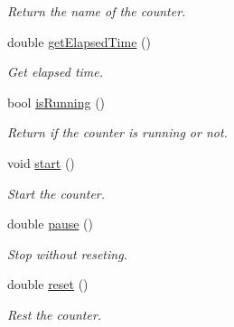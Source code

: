 \begin{DoxyCompactItemize}
\begin{DoxyCompactList}\small\item\em Return the name of the counter. \end{DoxyCompactList}\item 
\hypertarget{class_time_counter_a27d1998986d33b4d037b7ed21f121b97}{double \hyperlink{class_time_counter_a27d1998986d33b4d037b7ed21f121b97}{get\+Elapsed\+Time} ()}\label{class_time_counter_a27d1998986d33b4d037b7ed21f121b97}

\begin{DoxyCompactList}\small\item\em Get elapsed time. \end{DoxyCompactList}\item 
\hypertarget{class_time_counter_a08647c9c74e1b6ba366df28e1d27e67e}{bool \hyperlink{class_time_counter_a08647c9c74e1b6ba366df28e1d27e67e}{is\+Running} ()}\label{class_time_counter_a08647c9c74e1b6ba366df28e1d27e67e}

\begin{DoxyCompactList}\small\item\em Return if the counter is running or not. \end{DoxyCompactList}\item 
\hypertarget{class_time_counter_aa10a840834e2d49c3979f448212a59de}{void \hyperlink{class_time_counter_aa10a840834e2d49c3979f448212a59de}{start} ()}\label{class_time_counter_aa10a840834e2d49c3979f448212a59de}

\begin{DoxyCompactList}\small\item\em Start the counter. \end{DoxyCompactList}\item 
\hypertarget{class_time_counter_a2f5bc943c35f19ccad8ef12cf7876d57}{double \hyperlink{class_time_counter_a2f5bc943c35f19ccad8ef12cf7876d57}{pause} ()}\label{class_time_counter_a2f5bc943c35f19ccad8ef12cf7876d57}

\begin{DoxyCompactList}\small\item\em Stop without reseting. \end{DoxyCompactList}\item 
double \hyperlink{class_time_counter_a7ab5f9bdfef98289f3013b3a8c250925}{reset} ()
\begin{DoxyCompactList}\small\item\em Rest the counter. \end{DoxyCompactList}\end{DoxyCompactItemize}
